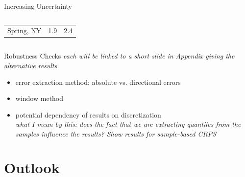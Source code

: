 \documentclass[en]{sdqbeamer}
\begin{document}
\begin{frame}{Increasing Uncertainty}
\begin{columns}
\begin{column}{0.4\textwidth}
\begin{table}
\begin{tabular}{ l c c }
Spring, NY &1.9 &2.4 \\ 
\end{tabular}
\end{table}
\vspace{1.25cm}
\end{column}
\end{columns}


\end{frame}

\begin{frame}{Robustness Checks}
\textit{each will be linked to a short slide in Appendix giving the alternative results}
\begin{itemize}
    \item error extraction method: absolute vs. directional errors
    \item window method
    \item potential dependency of results on discretization \\
    \textit{what I mean by this: does the fact that we are extracting quantiles from the samples influence the results? Show results for sample-based CRPS}
\end{itemize}
\end{frame}



\section{Outlook}
\end{document}
